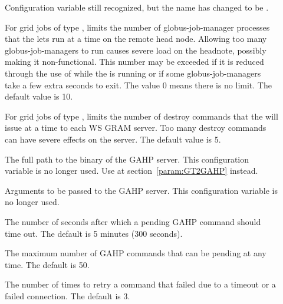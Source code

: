 \begin{description}
\item[]
\label{param:GridmanagerMaxPendingSubmits} Configuration variable
still recognized, but the name has changed to be
.

\item[]
\label{param:GridmanagerMaxJobmanagersPerResource}
For grid jobs of type , limits the number of globus-job-manager
processes that the  lets run at a time on
the remote head node. Allowing too many globus-job-managers to run
causes severe load on the headnote, possibly making it
non-functional.
This number may be exceeded if it is reduced through the use
of  while the  is running
or if some globus-job-managers take a few extra seconds to exit.
The value 0 means there is no limit. The default value is 10.

\item[]
\label{param:GridmanagerMaxWsDestroysPerResource}
For grid jobs of type , limits the number of destroy
commands that the  will issue at a time to each
WS GRAM server. Too many destroy commands can have severe effects on
the server. The default value is 5.

\item[]
\label{param:Gahp} The full path to the binary of the GAHP server.
This configuration variable is no longer used.
Use  at section~\ref{param:GT2GAHP} instead.

\item[]
\label{param:GahpArgs} Arguments to be passed to the GAHP server.
This configuration variable is no longer used.

\item[]
\label{param:GridmanagerGahpCallTimeout} The number of seconds after
which a pending GAHP command should time out. The default is 5 minutes
(300 seconds).

\item[]
\label{param:GridmanagerMaxPendingRequests} The maximum number of GAHP
commands that can be pending at any time. The default is 50.

\item[]
\label{param:GridmanagerConnectFailureRetryCount} The number of times
to retry a command that failed due to a timeout or a failed connection.
The default is 3.


\end{description}
